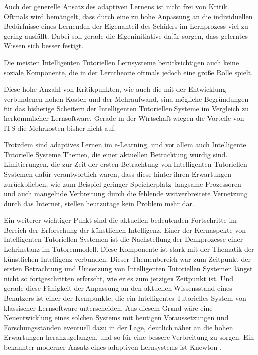 Auch der generelle Ansatz des adaptiven Lernens ist nicht frei von Kritik. Oftmals wird bemängelt, dass durch eine
zu hohe Anpassung an die individuellen Bedürfnisse eines Lernenden der Eigenanteil des Schülers
im Lernprozess viel zu gering ausfällt. Dabei soll gerade die Eigeninitiative
dafür sorgen, dass gelerntes Wissen sich besser festigt.

Die meisten Intelligenten Tutoriellen Lernsysteme berücksichtigen auch keine soziale Komponente, die in der Lerntheorie
oftmals jedoch eine große Rolle spielt.

Diese hohe Anzahl von Kritikpunkten, wie auch die mit der Entwicklung verbundenen hohen Kosten und der Mehraufwand,
sind mögliche Begründungen für das bisherige Scheitern der Intelligenten Tutoriellen Systeme im Vergleich
zu herkömmlicher Lernsoftware. Gerade in der Wirtschaft wiegen die Vorteile von ITS die Mehrkosten bisher nicht auf.

Trotzdem sind adaptives Lernen im e-Learning, und vor allem auch Intelligente Tutorielle Systeme Themen,
die einer aktuellen Betrachtung würdig sind. Limitierungen, die zur Zeit der ersten Betrachtung von Intelligenten Tutoriellen Systemen
dafür verantwortlich waren, dass diese hinter ihren Erwartungen zurückblieben, wie zum Beispiel geringer Speicherplatz, langsame Prozessoren
und auch mangelnde Verbreitung durch die fehlende weitverbreitete Vernetzung durch das Internet, stellen heutzutage kein Problem mehr dar.

Ein weiterer wichtiger Punkt sind die aktuellen bedeutenden Fortschritte im Bereich der Erforschung der künstlichen Intelligenz.
Einer der Kernaspekte von Intelligenten Tutoriellen Systemen ist die Nachstellung der Denkprozesse einer Lehrinstanz im Tutorenmodell.
Diese Komponente ist stark mit der Thematik der künstlichen Intelligenz verbunden. Dieser Themenbereich war zum Zeitpunkt der ersten Betrachtung und Umsetzung von
Intelligenten Tutoriellen Systemen längst nicht so fortgeschritten erforscht, wie er es zum jetzigen Zeitpunkt ist. Und gerade diese Fähigkeit der Anpassung
an den aktuellen Wissensstand eines Benutzers ist einer der Kernpunkte, die ein Intelligentes Tutorielles System von klassischer Lernsoftware unterscheiden.
Aus diesem Grund wäre eine Neuentwicklung eines solchen Systems mit heutigen Voraussetzungen und Forschungsständen eventuell dazu in der Lage,
deutlich näher an die hohen Erwartungen heranzugelangen, und so für eine bessere Verbreitung zu sorgen.
Ein bekannter moderner Ansatz eines adaptiven Lernsystems ist Knewton \cite{knewton}.
